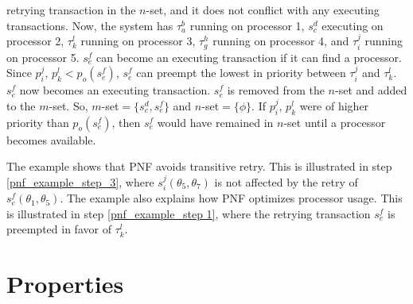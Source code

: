 \begin{compactenum}
retrying transaction in the $n$-set, and it does not conflict with
any executing transactions. Now, the system has $\tau_{a}^{b}$ running
on processor 1, $s_{c}^{d}$ executing on processor 2, $\tau_{k}^{l}$
running on processor 3, $\tau_{g}^{h}$ running on processor 4, and
$\tau_{i}^{j}$ running on processor 5. $s_{e}^{f}$ can become an
executing transaction if it can find a processor. 
%
Since $p_{i}^{j},\, p_{k}^{l}<p_{o}(s_{e}^{f})$,
$s_{e}^{f}$ can preempt the lowest in priority between $\tau_{i}^{j}$
and $\tau_{k}^{l}$. $s_{e}^{f}$ now becomes an executing transaction.
$s_{e}^{f}$ is removed from the $n$-set and added to the $m$-set.
So, $m$-set$=\{s_{c}^{d},s_{e}^{f}\}$ and $n$-set$=\{\phi\}$. If $p_{i}^{j},\, p_{k}^{l}$
were of higher priority than $p_{o}(s_{e}^{f})$, then $s_{e}^{f}$
would have remained in $n$-set until a processor becomes available.
%
\end{compactenum}
The  example shows that PNF avoids transitive retry. This is illustrated in step \ref{pnf_example_step_3}, where $s_{i}^{j}(\theta_{5},\theta_{7})$ is not affected by the  retry of $s_{e}^{f}(\theta_{1},\theta_{5})$. The example also explains how
PNF optimizes processor usage. This is illustrated in step \ref{pnf_example_step 1}, 
where the retrying transaction $s_{e}^{f}$ is preempted in favor of $\tau_{k}^{l}$.


\section{Properties\label{pnf properties sec}}

